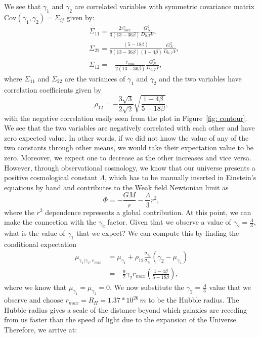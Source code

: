 \documentclass[aps,pra,amsmath,amssymb,amsthm,floatfix,nofootinbib,notitlepage,superscriptaddress,10pt]{revtex4-2}
\begin{document}
We see that $\gamma_1$ and $\gamma_2$ are correlated variables with symmetric covariance matrix $\text{Cov}(\gamma_1,\gamma_2)=\Sigma_{ij}$ given by:
\begin{align}
	&\Sigma_{11}=\frac{2  r_{max}^2}{3 (13-36 \beta)}\frac{G_N^2}{ D_{0,T} V},  \nonumber\\
	&\Sigma_{22}= \frac{(5-18\beta)}{9(13-36 \beta ) (1-4 \beta ) }\frac{G_N^2}{ D_{0,T} V}, \nonumber\\
	&\Sigma_{12} = -\frac{ r_{max}}{2 (13-36 \beta)}\frac{G_N^2}{ D_{0,T} V} ,
	\label{eq: CovarianceMatrix}
\end{align}
where $\Sigma_{11}$ and $\Sigma_{22}$ are the variances of $\gamma_1$ and $\gamma_2$ and the two variables have correlation coefficients given by
\begin{equation}
	\rho_{12}=- \frac{3\sqrt{3}}{2\sqrt{2}}\sqrt{\frac{1-4\beta}{5-18\beta}},
	\label{eq: CorrelationCoefficients}
\end{equation}
with the negative correlation easily seen from the plot in Figure~\ref{fig: contour}.
We see that the two variables are negatively correlated with each other and have zero expected value. In other words, if we did not know the value of any of the two constants through other means, we would take their expectation value to be zero. Moreover, we expect one to decrease as the other increases and vice versa.
However, through observational cosmology, we know that our universe presents a positive cosmological constant $\Lambda$, which has to be manually inserted in Einstein's equations by hand and contributes to the Weak field Newtonian limit as
\begin{equation}
	\Phi = -\frac{GM}{r} -\frac{\Lambda}{3}r^2,
\end{equation}
where the $r^2$ dependence represents a global contribution. At this point, we can make the connection with the $\gamma_2$ factor. Given that we observe a value of $\gamma_2=\frac{\Lambda}{3}$, what is the value of $\gamma_1$ that we expect? We can compute this by finding the conditional expectation
\begin{equation}
	\begin{split}
		\mu_{\gamma_1|\gamma_2,r_{max}}&=\mu_{\gamma_1} + \rho_{12}\frac{\sigma_{\gamma_1}}{\sigma_{\gamma_2}}(\gamma_2-\mu_{\gamma_2})\\
		&=-\frac{9}{2}\gamma_2 r_{max}\left(\frac{1-4 \beta }{5-18 \beta}\right),
	\end{split}
\end{equation}
where we know that $\mu_{\gamma_1}=\mu_{\gamma_2}=0$. We now substitute the $\gamma_2=\frac{\Lambda}{3}$ value that we observe and choose $r_{max}=R_H=1.37*10^{26}\,m$ to be the Hubble radius. The Hubble radius gives a scale of the distance beyond which galaxies are receding from us faster than the speed of light due to the expansion of the Universe. Therefore, we arrive at:
\end{document}
